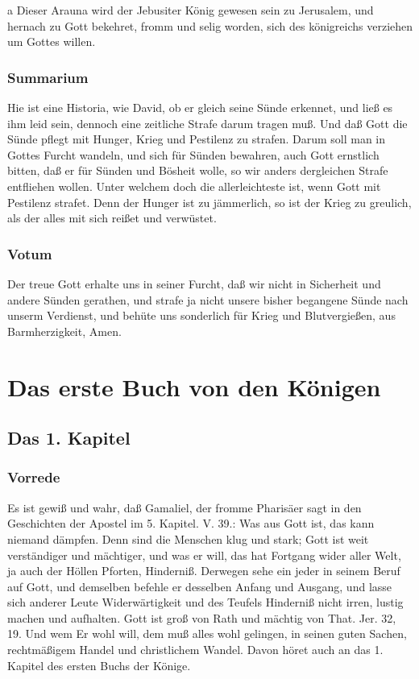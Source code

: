 
a Dieser Arauna wird der Jebusiter König gewesen sein zu Jerusalem, und hernach zu Gott bekehret, fromm und selig worden, sich des königreichs verziehen um Gottes willen.

\section{Summarium}

Hie ist eine Historia, wie David, ob er gleich seine Sünde erkennet, und ließ es ihm leid sein, dennoch eine zeitliche Strafe darum tragen muß. Und daß Gott die Sünde pflegt mit Hunger, Krieg und Pestilenz zu strafen. Darum soll man in Gottes Furcht wandeln, und sich für Sünden bewahren, auch Gott ernstlich bitten, daß er für Sünden und Bösheit wolle, so wir anders dergleichen Strafe entfliehen wollen. Unter welchem doch die allerleichteste ist, wenn Gott mit Pestilenz strafet. Denn der Hunger ist zu jämmerlich, so ist der Krieg zu greulich, als der alles mit sich reißet und verwüstet.

\section{Votum}

Der treue Gott erhalte uns in seiner Furcht, daß wir nicht in Sicherheit und andere Sünden gerathen, und strafe ja nicht unsere bisher begangene Sünde nach unserm Verdienst, und behüte uns sonderlich für Krieg und Blutvergießen, aus Barmherzigkeit, Amen.

\part{Das erste Buch von den Königen}

\chapter{Das 1. Kapitel}

\section{Vorrede}

Es ist gewiß und wahr, daß Gamaliel, der fromme Pharisäer sagt in den Geschichten der Apostel im 5. Kapitel. V. 39.: Was aus Gott ist, das kann niemand dämpfen. Denn sind die Menschen klug und stark; Gott ist weit verständiger und mächtiger, und was er will, das hat Fortgang wider aller Welt, ja auch der Höllen Pforten, Hinderniß. Derwegen sehe ein jeder in seinem Beruf auf Gott, und demselben befehle er desselben Anfang und Ausgang, und lasse sich anderer Leute Widerwärtigkeit und des Teufels Hinderniß nicht irren, lustig machen und aufhalten. Gott ist groß von Rath und mächtig von That. Jer. 32, 19. Und wem Er wohl will, dem muß alles wohl gelingen, in seinen guten Sachen, rechtmäßigem Handel und christlichem Wandel. Davon höret auch an das 1. Kapitel des ersten Buchs der Könige.

